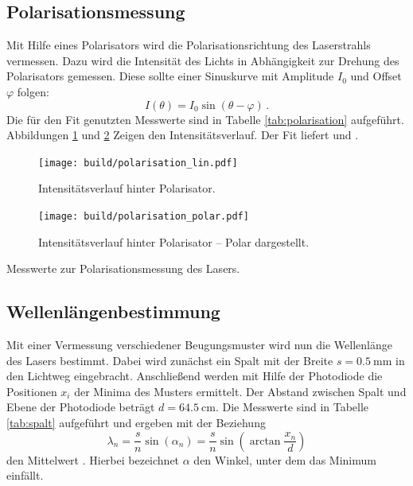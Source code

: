 \subsection{Polarisationsmessung}
\label{subsec:polarisation}
Mit Hilfe eines Polarisators wird die Polarisationsrichtung des Laserstrahls  
vermessen.
Dazu wird die Intensität des Lichts in Abhängigkeit zur Drehung des
Polarisators gemessen.
Diese sollte einer Sinuskurve mit Amplitude $I_0$ und Offset $\varphi$ folgen:
\begin{equation*}
    I(\theta) = I_0 \sin\!\left(\theta-\varphi\right)\,.
\end{equation*}
Die für den Fit genutzten Messwerte sind in Tabelle \ref{tab:polarisation}
aufgeführt. Abbildungen \ref{fig:polarisation} und \ref{fig:polarisation_polar}
Zeigen den Intensitätsverlauf.
Der Fit liefert  und
\unskip.
\begin{figure}
    \centering
    \texttt{[image: build/polarisation\_lin.pdf]}
    \caption{Intensitätsverlauf hinter Polarisator.}
    \label{fig:polarisation}
\end{figure}
\begin{figure}
    \centering
    \texttt{[image: build/polarisation\_polar.pdf]}
    \caption{Intensitätsverlauf hinter Polarisator -- Polar dargestellt.}
    \label{fig:polarisation_polar}
\end{figure}
\begin{table}
    \centering
    \caption{Messwerte zur Polarisationsmessung des Lasers.}
    \label{tab:polarisation}
    
\end{table}

\subsection{Wellenlängenbestimmung}
\label{subsec:wellenlänge}
Mit einer Vermessung verschiedener Beugungsmuster wird nun die Wellenlänge des
Lasers bestimmt.
Dabei wird zunächst ein Spalt mit der Breite $s = \SI{0.5}{\milli\meter}$ in den Lichtweg eingebracht.
Anschließend werden mit Hilfe der Photodiode die Positionen $x_i$ der Minima des Musters ermittelt.
Der Abstand zwischen Spalt und Ebene der Photodiode beträgt $d = \SI{64.5}{\centi\meter}$.
Die Messwerte sind in Tabelle \ref{tab:spalt} aufgeführt und ergeben mit der Beziehung
\begin{equation}
    \label{eq:spalt}
    \lambda_n = \frac{s}{n}\sin\!\left(\alpha_n\right) = \frac{s}{n}\sin\!\left(\arctan\frac{x_n}{d}\right)
\end{equation}
den Mittelwert \unskip.
Hierbei bezeichnet $\alpha$ den Winkel, unter dem das Minimum einfällt.

